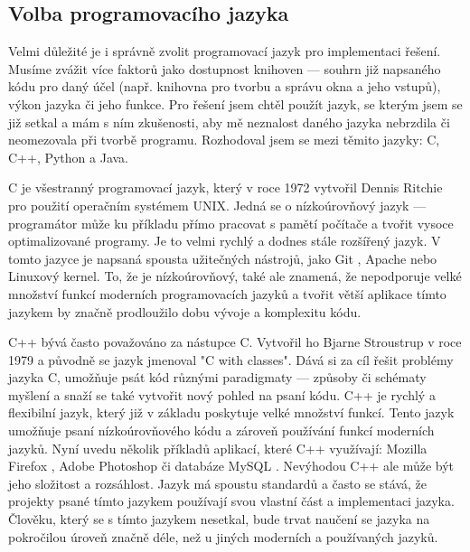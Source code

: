 \documentclass[12pt]{article}
\begin{document}
\subsection{Volba programovacího jazyka}

Velmi důležité je i správně zvolit programovací jazyk pro implementaci řešení. Musíme zvážit více faktorů jako dostupnost knihoven — souhrn již napsaného kódu pro daný účel (např. knihovna pro tvorbu a správu okna a jeho vstupů), výkon jazyka či jeho funkce. Pro řešení jsem chtěl použít jazyk, se kterým jsem se již setkal a mám s ním zkušenosti, aby mě neznalost daného jazyka nebrzdila či neomezovala při tvorbě programu. Rozhodoval jsem se mezi těmito jazyky: C, C++, Python a Java.

C \cite{kandr} je všestranný programovací jazyk, který v roce 1972 vytvořil Dennis Ritchie pro použití operačním systémem UNIX. Jedná se o nízkoúrovňový jazyk — programátor může ku příkladu přímo pracovat s pamětí počítače a tvořit vysoce optimalizované programy. Je to velmi rychlý a dodnes stále rozšířený jazyk. V tomto jazyce je napsaná spousta užitečných nástrojů, jako Git \cite{git}, Apache \cite{apache} nebo Linuxový \cite{linux} kernel. To, že je nízkoúrovňový, také ale znamená, že nepodporuje velké množství funkcí moderních programovacích jazyků a tvořit větší aplikace tímto jazykem by značně prodloužilo dobu vývoje a komplexitu kódu.

C++ \cite{cpp} bývá často považováno za nástupce C. Vytvořil ho Bjarne Stroustrup v roce 1979 a původně se jazyk jmenoval "C with classes". Dává si za cíl řešit problémy jazyka C, umožňuje psát kód různými paradigmaty — způsoby či schématy myšlení a snaží se také vytvořit nový pohled na psaní kódu. C++ je rychlý a flexibilní jazyk, který již v základu poskytuje velké množství funkcí. Tento jazyk umožňuje psaní nízkoúrovňového kódu a zároveň používání funkcí moderních jazyků. Nyní uvedu několik příkladů aplikací, které C++ využívají: Mozilla Firefox \cite{firefox}, Adobe Photoshop \cite{photoshop} či databáze MySQL \cite{mysql}. Nevýhodou C++ ale může být jeho složitost a rozsáhlost. Jazyk má spoustu standardů a často se stává, že projekty psané tímto jazykem používají svou vlastní část a implementaci jazyka. Člověku, který se s tímto jazykem nesetkal, bude trvat naučení se jazyka na pokročilou úroveň značně déle, než u jiných moderních a používaných jazyků.
\end{document}
